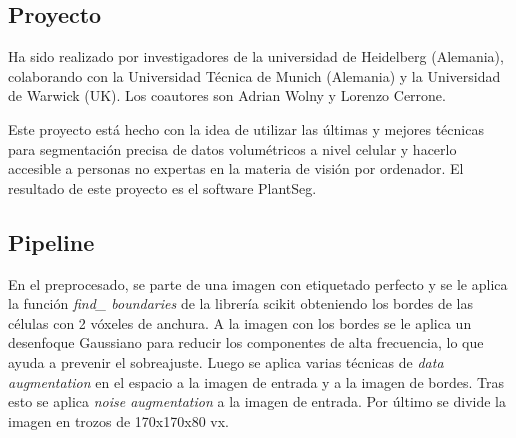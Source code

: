 \subsection{Proyecto}\label{app2_proyect}

Ha sido realizado por investigadores de la universidad de Heidelberg (Alemania), colaborando con la Universidad Técnica de Munich (Alemania) y la Universidad de Warwick (UK). Los coautores son Adrian Wolny y Lorenzo Cerrone.\cite{Wolny2020}

Este proyecto está hecho con la idea de utilizar las últimas y mejores técnicas para segmentación precisa de datos volumétricos a nivel celular y hacerlo accesible a personas no expertas en la materia de visión por ordenador. El resultado de este proyecto es el software PlantSeg.

\subsection{Pipeline}\label{app2_pipeline}


En el preprocesado, se parte de una imagen con etiquetado perfecto y se le aplica la función \textit{find\_ boundaries} de la librería scikit \cite{Pedregosa2011} \cite{Walt2014} obteniendo los bordes de las células con 2 vóxeles de anchura. A la imagen con los bordes se le aplica un desenfoque Gaussiano para reducir los componentes de alta frecuencia, lo que ayuda a prevenir el sobreajuste. Luego se aplica varias técnicas de \textit{data augmentation} en el espacio a la imagen de entrada y a la imagen de bordes. Tras esto se aplica \textit{noise augmentation} a la imagen de entrada. Por último se divide la imagen en trozos de 170x170x80 vx.

